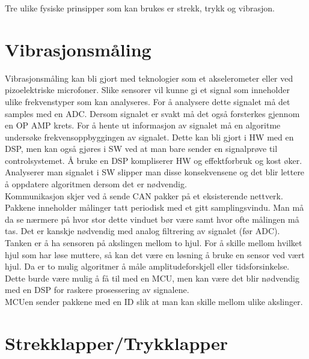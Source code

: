 Tre ulike fysiske prinsipper som kan brukes er strekk, trykk og vibrasjon. \\

\section{Vibrasjonsmåling}

Vibrasjonsmåling kan bli gjort med teknologier som et akselerometer eller ved
pizoelektriske microfoner. Slike sensorer vil kunne gi et signal som inneholder
ulike frekvenstyper som kan analyseres. For å analysere dette signalet må det
samples med en ADC. Dersom signalet er svakt må det også forsterkes gjennom en
OP AMP krets. For å hente ut informasjon av signalet må en algoritme undersøke
frekvensoppbyggingen av signalet. Dette kan bli gjort i HW med en DSP, men kan
også gjøres i SW ved at man bare sender en signalprøve til controlsystemet. Å
bruke en DSP kompliserer HW og effektforbruk og kost øker. Analyserer man
signalet i SW slipper man disse konsekvensene og det blir lettere å oppdatere
algoritmen dersom det er nødvendig. \\

Kommunikasjon skjer ved å sende CAN pakker på et eksisterende nettverk. Pakkene
inneholder målinger tatt periodisk med et gitt samplingsvindu. Man må da se
nærmere på hvor stor dette vinduet bør være samt hvor ofte målingen må tas. Det
er kanskje nødvendig med analog filtrering av signalet (før ADC). \\

Tanken er å ha sensoren på akslingen mellom to hjul. For å skille mellom hvilket
hjul som har løse muttere, så kan det være en løsning å bruke en sensor ved vært
hjul. Da er to mulig algoritmer å måle amplitudeforskjell eller
tidsforsinkelse. Dette burde være mulig å få til med en MCU, men kan være det
blir nødvendig med en DSP for raskere prosessering av signalene. \\

MCUen sender pakkene med en ID slik at man kan skille mellom ulike akslinger. \\

\section{Strekklapper/Trykklapper}

